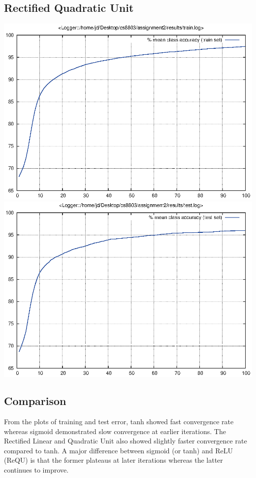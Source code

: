 \documentclass[twoside,12pt]{article}
\newcommand{\imsize}{0.5\linewidth}
\begin{document}
\subsection{Rectified Quadratic Unit}
\includegraphics[width=\imsize]{assignment2/results/requ_train}
\includegraphics[width=\imsize]{assignment2/results/requ_test}

\subsection{Comparison}

From the plots of training and test error, tanh showed fast convergence rate whereas sigmoid demonstrated
slow convergence at earlier iterations. The Rectified Linear and Quadratic Unit also showed slightly faster
convergence rate compared to tanh. A major difference between sigmoid (or tanh) and ReLU (ReQU) is that
the former plateaus at later iterations whereas the latter continues to improve.
\end{document}
